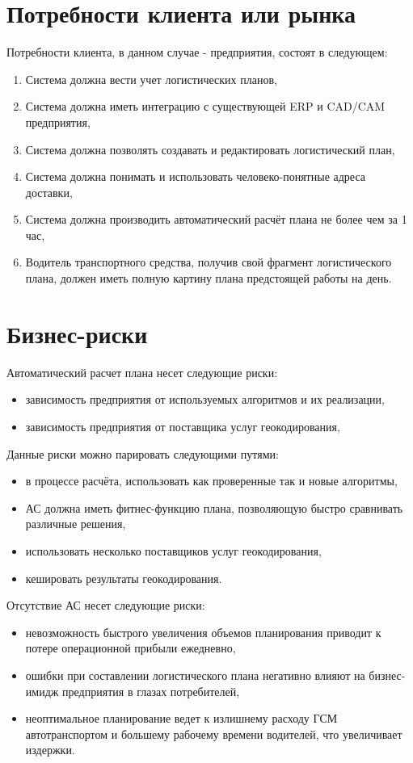 \section{Потребности клиента или рынка}
\label{sec:reqirements}

Потребности клиента, в данном случае - предприятия, состоят в следующем:
\begin{enumerate}
    \item Система должна вести учет логистических планов,
    \item Система должна иметь интеграцию с существующей ERP и CAD/CAM предприятия,
    \item Система должна позволять создавать и редактировать логистический план,
    \item Система должна понимать и использовать человеко-понятные адреса доставки,
    \item Система должна производить автоматический расчёт плана не более чем за 1 час,
    \item Водитель транспортного средства, получив свой фрагмент логистического плана, должен иметь полную картину плана предстоящей работы на день.
\end{enumerate}


\section{Бизнес-риски}
\label{sec:risks}

Автоматический расчет плана несет следующие риски:
\begin{itemize}
    \item зависимость предприятия от используемых алгоритмов и их реализации,
    \item зависимость предприятия от поставщика услуг геокодирования,
\end{itemize}

Данные риски можно парировать следующими путями:
\begin{itemize}
    \item в процессе расчёта, использовать как проверенные так и новые алгоритмы,
    \item АС должна иметь фитнес-функцию плана, позволяющую быстро сравнивать различные решения,
    \item использовать несколько поставщиков услуг геокодирования,
    \item кешировать результаты геокодирования.
\end{itemize}

Отсутствие АС несет следующие риски:
\begin{itemize}
    \item невозможность быстрого увеличения объемов планирования приводит к потере операционной прибыли ежедневно,
    \item ошибки при составлении логистического плана негативно влияют на бизнес-имидж предприятия в глазах потребителей,
    \item неоптимальное планирование ведет к излишнему расходу ГСМ автотранспортом и большему рабочему времени водителей, что увеличивает издержки.
\end{itemize}

\endinput
